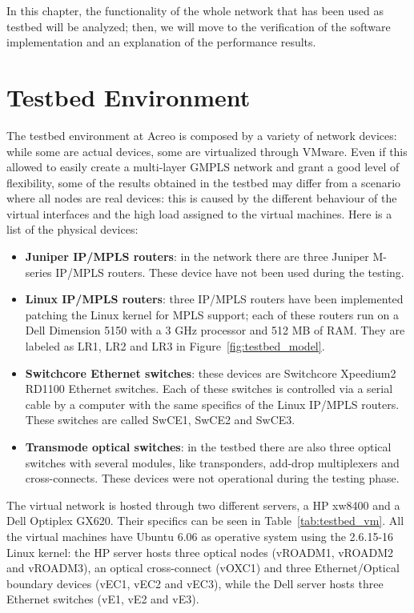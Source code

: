 \documentclass[10pt,a4paper]{report}
\begin{document}
In this chapter, the functionality of the whole network that has been
used as testbed will be analyzed; then, we will move to the
verification of the software implementation and an explanation of the
performance results.
 
\section{Testbed Environment}
 
The testbed environment at Acreo is composed by a variety of network
devices: while some are actual devices, some are virtualized through
VMware. Even if this allowed to easily create a multi-layer GMPLS
network and grant a good level of flexibility, some of the results
obtained in the testbed may differ from a scenario where all nodes are
real devices: this is caused by the different behaviour of the virtual
interfaces and the high load assigned to the virtual machines. Here is
a list of the physical devices:
\begin{itemize}
\item \textbf{Juniper IP/MPLS routers}: in the network there are three
  Juniper M-series IP/MPLS routers. These device have not been used
  during the testing.
\item \textbf{Linux IP/MPLS routers}: three IP/MPLS routers have been
  implemented patching the Linux kernel for MPLS support; each of
  these routers run on a Dell Dimension 5150 with a 3 GHz processor
  and 512 MB of RAM\@. They are labeled as LR1, LR2 and LR3 in
  Figure~\ref{fig:testbed_model}.
\item \textbf{Switchcore Ethernet switches}: these devices are
  Switchcore Xpeedium2 RD1100 Ethernet switches. Each of these
  switches is controlled via a serial cable by a computer with the
  same specifics of the Linux IP/MPLS routers. These switches are
  called SwCE1, SwCE2 and SwCE3.
\item \textbf{Transmode optical switches}: in the testbed there are
  also three optical switches with several modules, like transponders,
  add-drop multiplexers and cross-connects. These devices were not
  operational during the testing phase.
\end{itemize}
 
The virtual network is hosted through two different servers, a HP
xw8400 and a Dell Optiplex GX620. Their specifics can be seen in
Table~\ref{tab:testbed_vm}. All the virtual machines have Ubuntu 6.06
as operative system using the 2.6.15-16 Linux kernel: the HP server
hosts three optical nodes (vROADM1, vROADM2 and vROADM3), an optical
cross-connect (vOXC1) and three Ethernet/Optical boundary devices
(vEC1, vEC2 and vEC3), while the Dell server hosts three Ethernet
switches (vE1, vE2 and vE3).
 
\end{document}
